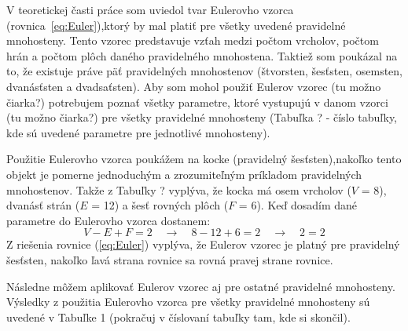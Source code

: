\quad\quad V teoretickej časti práce som uviedol tvar Eulerovho vzorca (rovnica~\ref{eq:Euler}),ktorý by mal platiť pre všetky uvedené pravidelné mnohosteny. Tento vzorec predstavuje vzťah medzi počtom vrcholov, počtom hrán a počtom plôch daného pravidelného mnohostena. Taktiež som poukázal na to, že existuje práve päť pravidelných mnohostenov (štvorsten, šesťsten, osemsten, dvanásťsten a dvadsaťsten). Aby som mohol použiť Eulerov vzorec ({\color{red}tu možno čiarka?}) potrebujem poznať všetky parametre, ktoré vystupujú v danom vzorci ({\color{red}tu možno čiarka?}) pre všetky pravidelné mnohosteny (Tabuľka ? - {\color{red}číslo tabuľky, kde sú uvedené parametre pre jednotlivé mnohosteny}). 
	
	Použitie Eulerovho vzorca poukážem na kocke (pravidelný šesťsten),nakoľko tento objekt je pomerne jednoduchým a zrozumiteľným príkladom pravidelných mnohostenov. Takže z Tabuľky {\color{red}?} vyplýva, že kocka má osem vrcholov ($V$ = 8), dvanásť strán ($E$ = 12) a šesť rovných plôch ($F$ = 6). Keď dosadím dané parametre do Eulerovho vzorca dostanem: 
	\begin{equation}
	V-E+F=2 \quad \rightarrow \quad 8-12+6=2 \quad \rightarrow \quad 2=2
	\label{eq:Euler}
	\end{equation}
	Z riešenia rovnice (\ref{eq:Euler}) vyplýva, že Eulerov vzorec je platný pre pravidelný šesťsten, nakoľko ľavá strana rovnice sa rovná pravej strane rovnice.
	
	Následne môžem aplikovať Eulerov vzorec aj pre ostatné pravidelné mnohosteny. Výsledky z použitia Eulerovho vzorca pre všetky pravidelné mnohosteny sú uvedené v Tabuľke 1 ({\color{red}pokračuj v číslovaní tabuľky tam, kde si skončil}).